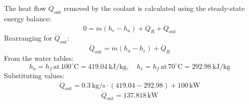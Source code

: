 The heat flow \( \dot{Q}_{\text{out}} \) removed by the coolant is calculated using the steady-state energy balance:  
\[
0 = \dot{m} (h_e - h_a) + \dot{Q}_R + \dot{Q}_{\text{out}}
\]  
Rearranging for \( \dot{Q}_{\text{out}} \):  
\[
\dot{Q}_{\text{out}} = \dot{m} (h_a - h_e) + \dot{Q}_R
\]  
From the water tables:  
\[
h_a = h_f \, \text{at} \, 100^\circ\text{C} = 419.04 \, \text{kJ/kg}, \quad h_e = h_f \, \text{at} \, 70^\circ\text{C} = 292.98 \, \text{kJ/kg}
\]  
Substituting values:  
\[
\dot{Q}_{\text{out}} = 0.3 \, \text{kg/s} \cdot (419.04 - 292.98) + 100 \, \text{kW}
\]  
\[
\dot{Q}_{\text{out}} = 137.818 \, \text{kW}
\]